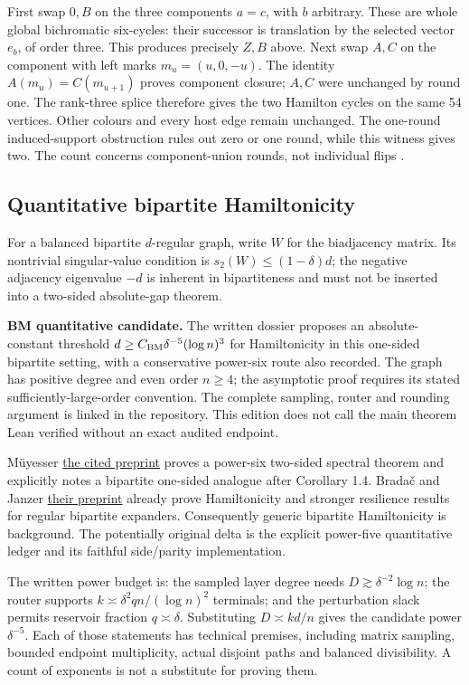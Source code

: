 \documentclass[smallextended]{svjour3}
\begin{document}
First swap \(0,B\) on the three components \(a=c\), with \(b\)
arbitrary. These are whole global bichromatic six-cycles: their
successor is translation by the selected vector \(e_b\), of order three.
This produces precisely \(Z,B\) above. Next swap \(A,C\) on the
component with left marks \(m_u=(u,0,-u)\). The identity
\(A(m_u)=C(m_{u+1})\) proves component closure; \(A,C\) were unchanged
by round one. The rank-three splice therefore gives the two Hamilton
cycles on the same 54 vertices. Other colours and every host edge remain
unchanged. The one-round induced-support obstruction rules out zero or
one round, while this witness gives two. The count concerns
component-union rounds, not individual flips \cite{ref11}.

\subsection{Quantitative bipartite
Hamiltonicity}\label{quantitative-bipartite-hamiltonicity}

For a balanced bipartite \(d\)-regular graph, write \(W\) for the
biadjacency matrix. Its nontrivial singular-value condition is
\(s_2(W)\leq(1-\delta)d\); the negative adjacency eigenvalue \(-d\) is
inherent in bipartiteness and must not be inserted into a two-sided
absolute-gap theorem.

\textbf{BM quantitative candidate.} The written dossier proposes an
absolute-constant threshold \(d\geq C_{\rm BM}\delta^{-5}(\log n)^3\)
for Hamiltonicity in this one-sided bipartite setting, with a
conservative power-six route also recorded. The graph has positive
degree and even order \(n\geq4\); the asymptotic proof requires its
stated sufficiently-large-order convention. The complete sampling,
router and rounding argument is linked in the repository. This edition
does not call the main theorem Lean verified without an exact audited
endpoint.

Müyesser \href{https://arxiv.org/html/2609.35766v1}{the cited preprint}
proves a power-six two-sided spectral theorem and explicitly notes a
bipartite one-sided analogue after Corollary 1.4. Bradač and Janzer
\href{https://arxiv.org/html/2605.15043v1}{their preprint} already prove
Hamiltonicity and stronger resilience results for regular bipartite
expanders. Consequently generic bipartite Hamiltonicity is background.
The potentially original delta is the explicit power-five quantitative
ledger and its faithful side/parity implementation.

The written power budget is: the sampled layer degree needs
\(D\gtrsim\delta^{-2}\log n\); the router supports
\(k\asymp\delta^2 qn/(\log n)^2\) terminals; and the perturbation slack
permits reservoir fraction \(q\asymp\delta\). Substituting
\(D\asymp kd/n\) gives the candidate power \(\delta^{-5}\). Each of
those statements has technical premises, including matrix sampling,
bounded endpoint multiplicity, actual disjoint paths and balanced
divisibility. A count of exponents is not a substitute for proving them.
\end{document}

